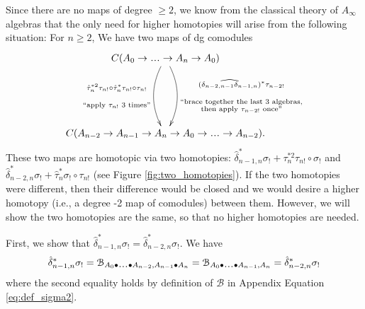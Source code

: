 Since there are no maps of degree 
$\geq2$, we know from the classical 
theory of $A_\infty$ algebras that 
the only need for higher homotopies 
will arise from the following 
situation: For $n\geq2$, 
We have two maps of dg comodules
\begin{equation}
\label{eq:two_maps}
\xymatrixrowsep{5pc}
\xymatrix{
C(A_0 \to \smdots \to A_n \to A_0) 
 \ar@/^1pc/[d]^{\substack{
   (\widehat{\delta_{n-2,n-1}\delta_{n-1,n}})^*
   \tau_{n-2!}\\\\\\
   \textrm{$``$brace together the last 3 algebras,}\\
   \textrm{then apply $\tau_{n-2!}$ once''}}}
 \ar@/_1pc/[d]_{\substack{
   \hat{\tau}_n^{*2} \tau_{n!}\circ
   \hat{\tau}_n^*\tau_{n!}\circ \tau_{n!}\\\\\\
   \textrm{$``$apply $\tau_{n!}$ 3 times''}}}\\
C(A_{n-2} \to A_{n-1} \to A_n \to 
A_0 \to \smdots \to A_{n-2}).
}
\end{equation}
These two maps are homotopic via 
two homotopies: 
$\hat{\delta}_{n-1,n}^*\sigma_!
+ \tau_n^{*2}\tau_{n!} \circ \sigma_!$ 
and 
$\hat{\delta}_{n-2,n}^*\sigma_! +
\hat{\tau}_n^*\sigma_!
\circ \tau_{n!}$ (see Figure 
\ref{fig:two_homotopies}). If the 
two homotopies were different, then 
their difference would be closed and
we would desire a higher homotopy (i.e., 
a degree -2 map of comodules) between 
them. However, we will show the 
two homotopies are the same, so that 
no higher homotopies are needed. 

First, we show that $\hat{\delta}_{n-1,n}^*
\sigma_! = \hat{\delta}_{n-2,n}^*\sigma_!$. 
We have
\begin{align*}
\hat{\delta}_{n-1,n}^*\sigma_!
=
\mathcal{B}_{A_0 \bullet \smdots \bullet A_{n-2},
  A_{n-1}\bullet A_n}
= \mathcal{B}_{A_0 \bullet \smdots \bullet A_{n-1},A_n} 
= \hat{\delta}_{n-2,n}^*\sigma_!
\end{align*}
where the second equality holds by definition 
of $\mathcal{B}$ in Appendix Equation 
\ref{eq:def_sigma2}.


